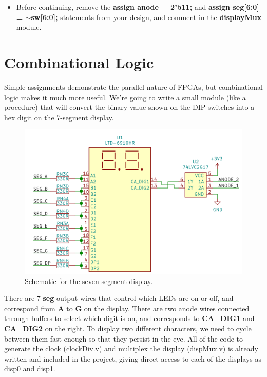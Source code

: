 \documentclass[12pt,a4paper]{article}
\begin{document}
\begin{itemize}
	\item Before continuing, remove the \textbf{assign anode = 2'b11;} and \textbf{assign seg[6:0] = $\sim$sw[6:0];} statements from your design, and comment in the \textbf{displayMux} module. 
\end{itemize}

\newpage
\section{Combinational Logic}
Simple assignments demonstrate the parallel nature of FPGAs, but combinational logic makes it much more useful. We’re going to write a small module (like a procedure) that will convert the binary value shown on the DIP switches into a hex digit on the 7-segment display.

\begin{figure}[H]
	\begin{centering}
		\includegraphics[width=\linewidth]{sevenSeg.png}
		\caption{Schematic for the seven segment display.}
	\end{centering}
\end{figure}
\noindent
There are 7 \textbf{seg} output wires that control which LEDs are on or off, and correspond from \textbf{A} to \textbf{G} on the display. There are two anode wires connected through buffers to select which digit is on, and corresponds to \textbf{CA\_DIG1} and \textbf{CA\_DIG2} on the right. To display two different characters, we need to cycle between them fast enough so that they persist in the eye. All of the code to generate the clock (clockDiv.v) and multiplex the display (dispMux.v) is already written and included in the project, giving direct access to each of the displays as disp0 and disp1.
\end{document}
